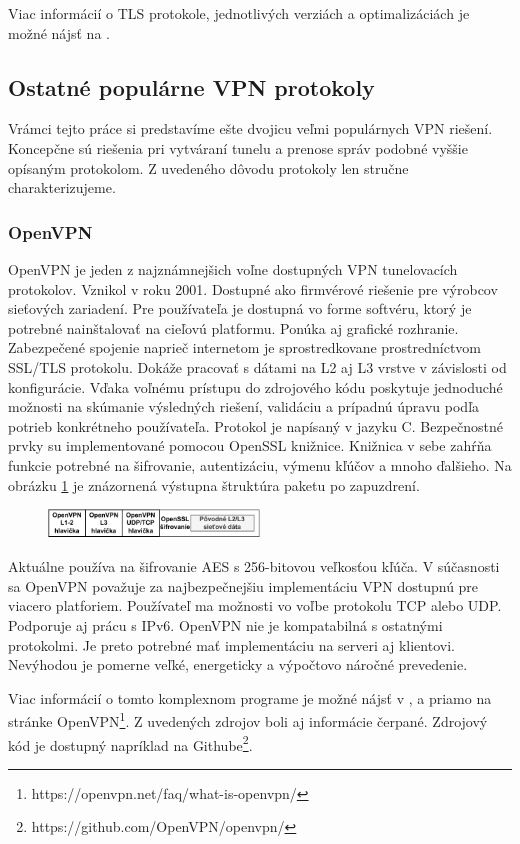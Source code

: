 Viac informácií o TLS protokole, jednotlivých verziách a optimalizáciách je možné nájsť na \cite{tls}. 
\subsection{Ostatné populárne VPN protokoly}
Vrámci tejto práce si predstavíme ešte dvojicu veľmi populárnych VPN riešení. Koncepčne sú riešenia pri vytváraní tunelu a prenose správ podobné vyššie opísaným protokolom. Z uvedeného dôvodu protokoly len stručne charakterizujeme.
\subsubsection{OpenVPN}
OpenVPN je jeden z najznámnejšich voľne dostupných VPN tunelovacích protokolov. Vznikol v roku 2001. Dostupné ako firmvérové riešenie pre výrobcov sieťových zariadení. Pre používateľa je dostupná vo forme softvéru, ktorý je potrebné nainštalovať na cieľovú platformu. Ponúka aj grafické rozhranie. Zabezpečené spojenie naprieč internetom je sprostredkovane prostredníctvom SSL/TLS protokolu. Dokáže pracovať s dátami na L2 aj L3 vrstve v závislosti od konfigurácie. Vďaka voľnému prístupu do zdrojového kódu poskytuje jednoduché možnosti na skúmanie výsledných riešení, validáciu a prípadnú úpravu podľa potrieb konkrétneho používateľa. Protokol je napísaný v jazyku C. Bezpečnostné prvky su implementované pomocou OpenSSL knižnice. Knižnica v sebe zahŕňa funkcie potrebné na šifrovanie, autentizáciu, výmenu kľúčov a mnoho ďalšieho. Na obrázku \ref{ovpnptstrc} je znázornená výstupna štruktúra paketu po zapuzdrení. 
\begin{figure}[!h]
	\centering
	\includegraphics[width=0.5\textwidth]{figures/ovpnptstrc}
	\caption{}
	\label{ovpnptstrc}
\end{figure}

Aktuálne používa na šifrovanie AES s 256-bitovou veľkosťou kľúča. V súčasnosti sa OpenVPN považuje za najbezpečnejšiu implementáciu VPN dostupnú pre viacero platforiem. Používateľ ma možnosti vo voľbe protokolu TCP alebo UDP. Podporuje aj prácu s IPv6. OpenVPN nie je kompatabilná s ostatnými protokolmi. Je preto potrebné mať implementáciu na serveri aj klientovi. Nevýhodou je pomerne veľké, energeticky a výpočtovo náročné prevedenie.

Viac informácií o tomto komplexnom programe je možné nájsť v \cite{vpntech}, \cite{ovpn} a priamo na stránke OpenVPN\footnote{https://openvpn.net/faq/what-is-openvpn/}. Z uvedených zdrojov boli aj informácie čerpané. Zdrojový kód je dostupný napríklad na Githube\footnote{https://github.com/OpenVPN/openvpn/}. 
